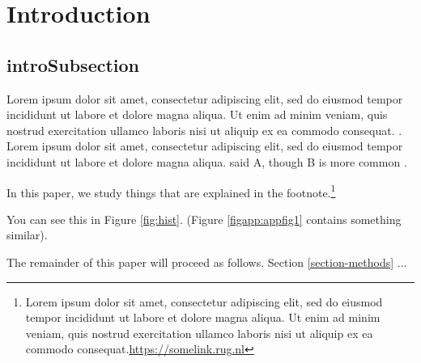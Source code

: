 
\vspace{10cm}
\newpage

\section{Introduction}\label{section-intro}
\subsection{introSubsection}


Lorem ipsum dolor sit amet, consectetur adipiscing elit, sed do eiusmod tempor incididunt ut labore et dolore magna aliqua. Ut enim ad minim veniam, quis nostrud exercitation ullamco laboris nisi ut aliquip ex ea commodo consequat.  \citep{oecd2018, oecd2020}. Lorem ipsum dolor sit amet, consectetur adipiscing elit, sed do eiusmod tempor incididunt ut labore et dolore magna aliqua. \cite{ridley2020} said A, though B is more common  \citep{bhat2022}. 


In this paper, we study things that are explained in the footnote.\footnote{Lorem ipsum dolor sit amet, consectetur adipiscing elit, sed do eiusmod tempor incididunt ut labore et dolore magna aliqua. Ut enim ad minim veniam, quis nostrud exercitation ullamco laboris nisi ut aliquip ex ea commodo consequat.\hyperlink{https://somelink.rug.nl}{https://somelink.rug.nl}} 

You can see this in Figure \ref{fig:hist}. (Figure \ref{figapp:appfig1} contains something similar). %

The remainder of this paper will proceed as follows. Section \ref{section-methods} ...




